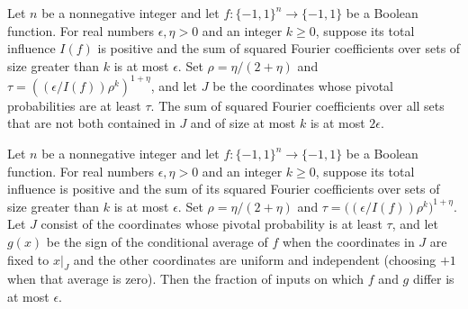 \begin{theorem}
\label{FABL.improvedFriedgut_small_spectrum_concentrated}
\leanok
{}
Let $n$ be a nonnegative integer and let $f:\{-1,1\}^n\to\{-1,1\}$ be a Boolean
function. For real numbers $\epsilon,\eta>0$ and an integer $k\ge0$, suppose its total
influence $I(f)$ is positive and the sum of squared Fourier coefficients over sets of
size greater than $k$ is at most $\epsilon$. Set $\rho=\eta/(2+\eta)$ and
$\tau=((\epsilon/I(f))\rho^k)^{1+\eta}$, and let $J$ be the coordinates whose pivotal
probabilities are at least $\tau$. The sum of squared Fourier coefficients over all sets
that are not both contained in $J$ and of size at most $k$ is at most $2\epsilon$.
\end{theorem}

\begin{theorem}
\label{FABL.improvedFriedgut_coordinateJunta_close}
\leanok
{}
Let $n$ be a nonnegative integer and let $f:\{-1,1\}^n\to\{-1,1\}$ be a Boolean
function. For real numbers $\epsilon,\eta>0$ and an integer $k\ge0$, suppose its total
influence is positive and the sum of its squared Fourier coefficients over sets of size
greater than $k$ is at most $\epsilon$. Set $\rho=\eta/(2+\eta)$ and
$\tau=\bigl((\epsilon/I(f))\rho^k\bigr)^{1+\eta}$. Let $J$ consist of the coordinates
whose pivotal probability is at least $\tau$, and let $g(x)$ be the sign of the
conditional average of $f$ when the coordinates in $J$ are fixed to $x|_J$ and the other
coordinates are uniform and independent (choosing $+1$ when that average is zero). Then
the fraction of inputs on which $f$ and $g$ differ is at most $\epsilon$.
\end{theorem}


